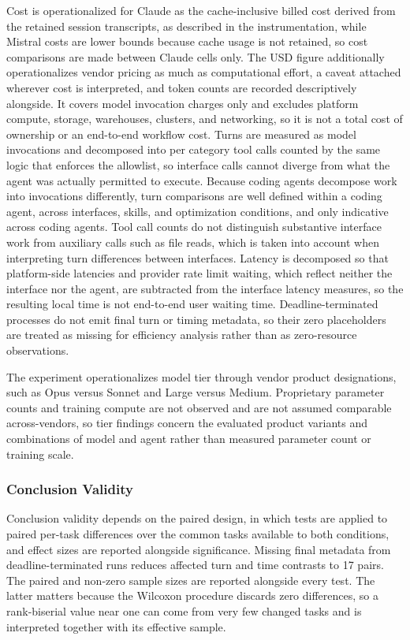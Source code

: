 \documentclass[
english,                 %
bibtex,                  %
]{kththesis}
\numberwithin{listing}{chapter}
\begin{document}
Cost is operationalized for Claude as the cache-inclusive billed cost derived from the retained session transcripts, as described in the instrumentation, while Mistral costs are lower bounds because cache usage is not retained, so cost comparisons are made between Claude cells only. The \gls{USD} figure additionally operationalizes vendor pricing as much as computational effort, a caveat attached wherever cost is interpreted, and token counts are recorded descriptively alongside. It covers model invocation charges only and excludes platform compute, storage, warehouses, clusters, and networking, so it is not a total cost of ownership or an end-to-end workflow cost. Turns are measured as model invocations and decomposed into per category tool calls counted by the same logic that enforces the allowlist, so interface calls cannot diverge from what the agent was actually permitted to execute. Because coding agents decompose work into invocations differently, turn comparisons are well defined within a coding agent, across interfaces, skills, and optimization conditions, and only indicative across coding agents. Tool call counts do not distinguish substantive interface work from auxiliary calls such as file reads, which is taken into account when interpreting turn differences between interfaces. Latency is decomposed so that platform-side latencies and provider rate limit waiting, which reflect neither the interface nor the agent, are subtracted from the interface latency measures, so the resulting local time is not end-to-end user waiting time. Deadline-terminated processes do not emit final turn or timing metadata, so their zero placeholders are treated as missing for efficiency analysis rather than as zero-resource observations.

The experiment operationalizes model tier through vendor product designations, such as Opus versus Sonnet and Large versus Medium. Proprietary parameter counts and training compute are not observed and are not assumed comparable across-vendors, so tier findings concern the evaluated product variants and combinations of model and agent rather than measured parameter count or training scale.

\subsubsection{Conclusion Validity}
\label{sec:method_conclusion_validity}

Conclusion validity depends on the paired design, in which tests are applied to paired per-task differences over the common tasks available to both conditions, and effect sizes are reported alongside significance. Missing final metadata from deadline-terminated runs reduces affected turn and time contrasts to 17 pairs. The paired and non-zero sample sizes are reported alongside every test. The latter matters because the Wilcoxon procedure discards zero differences, so a rank-biserial value near one can come from very few changed tasks and is interpreted together with its effective sample.
\end{document}
